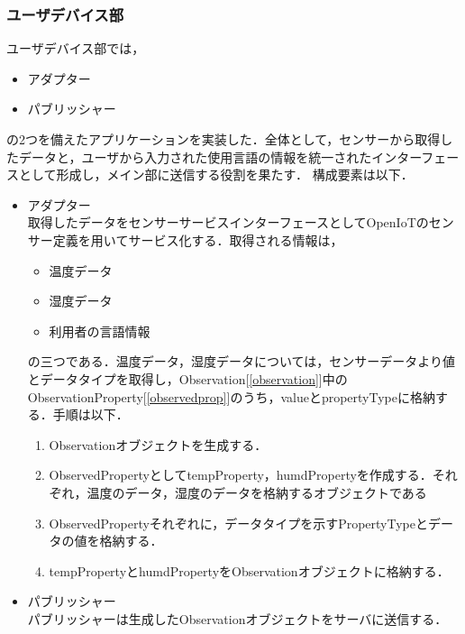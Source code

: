\documentclass{kuisthesis}			%
\begin{document}
\subsubsection{ユーザデバイス部}
ユーザデバイス部では，
\begin{itemize}
\item アダプター
\item パブリッシャー
\end{itemize}
の2つを備えたアプリケーションを実装した．全体として，センサーから取得したデータと，ユーザから入力された使用言語の情報を統一されたインターフェースとして形成し，メイン部に送信する役割を果たす．
構成要素は以下．
\begin{itemize}
\item アダプター\\
取得したデータをセンサーサービスインターフェースとしてOpenIoTのセンサー定義を用いてサービス化する．取得される情報は，
\begin{itemize}
\item 温度データ
\item 湿度データ
\item 利用者の言語情報
\end{itemize}
の三つである．温度データ，湿度データについては，センサーデータより値とデータタイプを取得し，Observation[\ref{observation}]中のObservationProperty[\ref{observedprop}]のうち，valueとpropertyTypeに格納する．手順は以下．
\begin{enumerate}
\item Observationオブジェクトを生成する．
\item ObservedPropertyとしてtempProperty，humdPropertyを作成する．それぞれ，温度のデータ，湿度のデータを格納するオブジェクトである
\item ObservedPropertyそれぞれに，データタイプを示すPropertyTypeとデータの値を格納する．
\item tempPropertyとhumdPropertyをObservationオブジェクトに格納する．
\end{enumerate}

\item パブリッシャー\\
パブリッシャーは生成したObservationオブジェクトをサーバに送信する．
\end{itemize}
\end{document}
